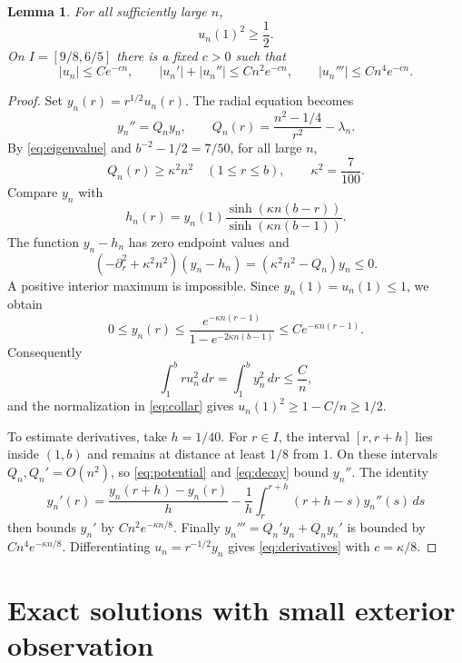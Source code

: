 \documentclass[11pt]{article}
\newtheorem{lemma}[theorem]{Lemma}
\begin{document}
\begin{lemma}\label{lem:decay}
For all sufficiently large \(n\),
\[
u_n(1)^2\ge\frac12.
\]
On \(I=[9/8,6/5]\) there is a fixed \(c>0\) such that
\begin{equation}\label{eq:derivatives}
|u_n|\le Ce^{-cn},\qquad
|u_n'|+|u_n''|\le Cn^2e^{-cn},\qquad
|u_n'''|\le Cn^4e^{-cn}.
\end{equation}
\end{lemma}
\begin{proof}
Set \(y_n(r)=r^{1/2}u_n(r)\). The radial equation becomes
\begin{equation}\label{eq:potential}
y_n''=Q_n y_n,\qquad
Q_n(r)=\frac{n^2-1/4}{r^2}-\lambda_n.
\end{equation}
By \eqref{eq:eigenvalue} and \(b^{-2}-1/2=7/50\), for all large \(n\),
\[
Q_n(r)\ge\kappa^2n^2\quad(1\le r\le b),\qquad
\kappa^2=\frac7{100}.
\]
Compare \(y_n\) with
\[
h_n(r)=y_n(1)\frac{\sinh(\kappa n(b-r))}
{\sinh(\kappa n(b-1))}.
\]
The function \(y_n-h_n\) has zero endpoint values and
\[
(-\partial_r^2+\kappa^2n^2)(y_n-h_n)
=(\kappa^2n^2-Q_n)y_n\le0.
\]
A positive interior maximum is impossible. Since \(y_n(1)=u_n(1)\le1\),
we obtain
\begin{equation}\label{eq:decay}
0\le y_n(r)\le
\frac{e^{-\kappa n(r-1)}}{1-e^{-2\kappa n(b-1)}}
\le Ce^{-\kappa n(r-1)}.
\end{equation}
Consequently
\[
\int_1^b r u_n^2\,dr=\int_1^b y_n^2\,dr\le\frac Cn,
\]
and the normalization in \eqref{eq:collar} gives
\(u_n(1)^2\ge1-C/n\ge1/2\).

To estimate derivatives, take \(h=1/40\). For \(r\in I\), the interval
\([r,r+h]\) lies inside \((1,b)\) and remains at distance at least \(1/8\)
from \(1\). On these intervals \(Q_n,Q_n'=O(n^2)\), so
\eqref{eq:potential} and \eqref{eq:decay} bound \(y_n''\). The identity
\[
y_n'(r)=\frac{y_n(r+h)-y_n(r)}h
-\frac1h\int_r^{r+h}(r+h-s)y_n''(s)\,ds
\]
then bounds \(y_n'\) by \(Cn^2e^{-\kappa n/8}\).
Finally \(y_n'''=Q_n'y_n+Q_ny_n'\) is bounded by
\(Cn^4e^{-\kappa n/8}\). Differentiating \(u_n=r^{-1/2}y_n\) gives
\eqref{eq:derivatives} with \(c=\kappa/8\).
\end{proof}

\section{Exact solutions with small exterior observation}
\end{document}
